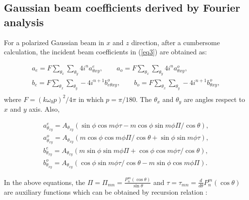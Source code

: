 \documentclass{osa-article}
\begin{document}
\begin{appendices}

\section{Gaussian beam coefficients derived by Fourier analysis}

For a polarized Gaussian beam in $x$ and $z$ direction, after a cumbersome calculation, the incident beam coefficients in (\ref{eq3}) are obtained as:

\begin{equation}\label{eq1_a}
\begin{gathered}
a_{e}=F\sum_{\theta_x}\sum_{\theta_y}4i^na^e_{\theta{xy}},\qquad
a_{o}=F\sum_{\theta_x}\sum_{\theta_y}4i^na^o_{\theta{xy}},\\
b_{e}=F\sum_{\theta_x}\sum_{\theta_y}-4i^{n+1}b^o_{e\theta{xy}},\qquad
b_{o}=F\sum_{\theta_x}\sum_{\theta_y}-4i^{n+1}b^o_{\theta{xy}},\\
\end{gathered}
\end{equation}
where $F=(k\omega_0p)^2/4\pi$ in which $p=\pi/180$. The $\theta_x$ and $\theta_y$ are angles respect to $x$ and $y$ axis. Also, 

\begin{equation}\label{eq2_a}
\begin{gathered}
 a^e_{\theta_{xy}}=A_{\theta_{xy}}(\sin\phi\cos m\phi\tau-m\cos\phi\sin m\phi\Pi/\cos\theta),\\
 a^o_{\theta_{xy}}=A_{\theta_{xy}}(m\cos\phi\cos m\phi\Pi/\cos\theta+\sin\phi\sin m\phi\tau),\\
 b^e_{\theta_{xy}}=A_{\theta_{xy}}(m\sin\phi\sin m\phi\Pi+\cos\phi\cos m\phi\tau/\cos\theta),\\
 b^o_{\theta_{xy}}=A_{\theta_{xy}}(\cos\phi\sin m\phi\tau/\cos\theta-m\sin\phi\cos m\phi\Pi).
\end{gathered}
\end{equation}

 In the above equations, the $\Pi=\Pi_{mn}=\frac{P^m_n(\cos\theta)}{\sin\theta}$ and $\tau=\tau_{mn}=\frac{d}{d\theta}P^m_n(\cos\theta)$ are auxiliary functions which can be obtained by recursion relation \cite{barber}: 
 

\end{appendices}
\end{document}
